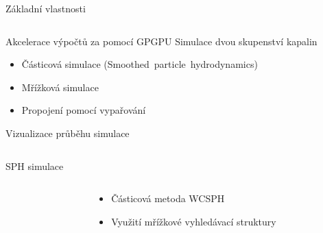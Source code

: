 \documentclass[10pt,xcolor=pdflatex,hyperref={unicode},aspectratio=169]{beamer}
\begin{document}
\begin{frame}{Základní vlastnosti}
    \begin{columns}
        \hspace{.4cm}
        \begin{column}{0.5\textwidth}
            Akcelerace výpočtů za pomocí GPGPU
            \bigbreak
            Simulace dvou skupenství kapalin
            \begin{itemize}
                \item Částicová simulace (Smoothed~particle~hydrodynamics)
                \item Mřížková simulace
                \item Propojení pomocí vypařování
            \end{itemize}
            \bigbreak
            Vizualizace průběhu simulace
        \end{column}
        \begin{column}{0.5\textwidth}
            \begin{center}
            \end{center}
        \end{column}
    \end{columns}
    
\end{frame}



\begin{frame}{SPH simulace}
        \begin{columns}
            \hspace{.4cm}
            \begin{column}{0.5\textwidth}
            \begin{center}
            \end{center}
        \end{column}
        \begin{column}{0.5\textwidth}
            \begin{itemize}
                \item Částicová metoda WCSPH
                \item Využití mřížkové vyhledávací struktury
            \end{itemize}
        \end{column}
    \end{columns}

    
\end{frame}
\end{document}
